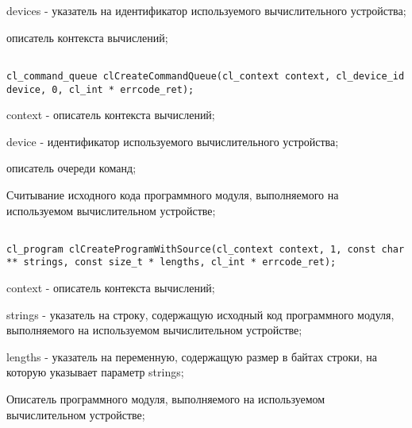 \begin{enumerate}
\begin{lstlisting}
\end{lstlisting}

		\openclend
		{
			\item devices - указатель на идентификатор используемого вычислительного устройства;
			\errcode
		}
		{описатель контекста вычислений;}


		
\begin{lstlisting}

cl_command_queue clCreateCommandQueue(cl_context context, cl_device_id device, 0, cl_int * errcode_ret);

\end{lstlisting}

		\openclend
		{
			\item context - описатель контекста вычислений;
			\item device - идентификатор используемого вычислительного устройства;
			\errcode
		}
		{описатель очереди команд;}


		\item Считывание исходного кода программного модуля, выполняемого на используемом вычислительном устройстве;



\begin{lstlisting}

cl_program clCreateProgramWithSource(cl_context context, 1, const char ** strings, const size_t * lengths, cl_int * errcode_ret);

\end{lstlisting}

		\openclend
		{
			\item context - описатель контекста вычислений;
			\item strings - указатель на строку, содержащую исходный код программного модуля, выполняемого на используемом вычислительном устройстве;
			\item lengths - указатель на переменную, содержащую размер в байтах строки, на которую указывает параметр strings;
			\errcodeslb
		}
		{Описатель программного модуля, выполняемого на используемом вычислительном устройстве;}


\end{enumerate}
